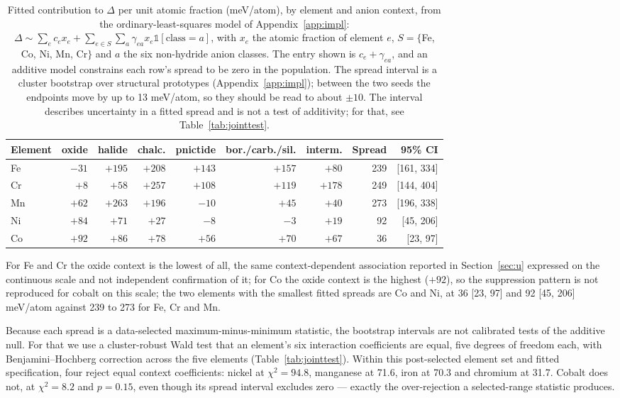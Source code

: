\documentclass[11pt]{article}
\begin{document}
\begin{table}[htbp]\centering
\caption{Fitted contribution to $\Delta$ per unit atomic fraction (meV/atom), by element
and anion context, from the ordinary-least-squares model of Appendix~\ref{app:impl}:
$\Delta \sim \sum_e c_e x_e + \sum_{e \in S}\sum_{a} \gamma_{ea} x_e
\mathbb{1}[\text{class}=a]$, with $x_e$ the atomic fraction of element $e$, $S = \{$Fe,
Co, Ni, Mn, Cr$\}$ and $a$ the six non-hydride anion classes. The entry shown is
$c_e + \gamma_{ea}$, and an additive model constrains each row's spread to be zero in the
population. The spread interval is a cluster bootstrap over structural prototypes
(Appendix~\ref{app:impl}); between the two seeds the endpoints move by up to 13 meV/atom,
so they should be read to about $\pm 10$. The interval describes
uncertainty in a fitted spread and is not a test of additivity; for that, see
Table~\ref{tab:jointtest}.}
\label{tab:context}
\small\begin{tabular}{lrrrrrrrr}
\toprule
Element & oxide & halide & chalc. & pnictide & bor./carb./sil. & interm. & Spread & 95\% CI \\
\midrule
Fe & $-31$ & $+195$ & $+208$ & $+143$ & $+157$ & $+80$ & 239 & [161, 334] \\
Cr & $+8$ & $+58$ & $+257$ & $+108$ & $+119$ & $+178$ & 249 & [144, 404] \\
Mn & $+62$ & $+263$ & $+196$ & $-10$ & $+45$ & $+40$ & 273 & [196, 338] \\
Ni & $+84$ & $+71$ & $+27$ & $-8$ & $-3$ & $+19$ & \phantom{0}92 & \phantom{0}[45, 206] \\
Co & $+92$ & $+86$ & $+78$ & $+56$ & $+70$ & $+67$ & \phantom{0}36 & \phantom{00}[23, 97] \\
\bottomrule
\end{tabular}
\end{table}

For Fe and Cr the oxide context is the lowest of all, the same context-dependent
association reported in Section~\ref{sec:u} expressed on the continuous scale and not
independent confirmation of it; for Co the oxide context is the highest ($+92$), so the
suppression pattern is not reproduced for cobalt on this scale; the two elements with the smallest fitted spreads are Co
and Ni, at 36 [23, 97] and 92 [45, 206] meV/atom against 239 to 273 for Fe, Cr and Mn.

Because each spread is a data-selected maximum-minus-minimum statistic, the bootstrap
intervals are not calibrated tests of the additive null. For that we use a
cluster-robust Wald test that an element's six interaction coefficients are equal, five
degrees of freedom each, with Benjamini--Hochberg correction across the five elements
(Table~\ref{tab:jointtest}). Within this post-selected element set and fitted
specification, four reject equal context coefficients: nickel at $\chi^2 = 94.8$,
manganese at 71.6, iron at 70.3 and chromium at 31.7. Cobalt does not, at $\chi^2 = 8.2$
and $p = 0.15$, even though its spread interval excludes zero --- exactly the
over-rejection a selected-range statistic produces.
\end{document}
